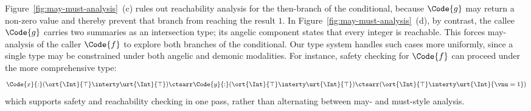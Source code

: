 Figure~\ref{fig:may-must-analysis}~(c) rules out reachability analysis for the then-branch of the conditional, because $\Code{g}$ may return a non-zero value and thereby prevent that branch from reaching the result $1$. In Figure~\ref{fig:may-must-analysis}~(d), by contrast, the callee $\Code{g}$ carries two summaries as an intersection type; its angelic component states that every integer is reachable. This forces may-analysis of the caller $\Code{f}$ to explore both branches of the conditional. Our type system handles such cases more uniformly, since a single type may be constrained under both angelic and demonic modalities. For instance, safety checking for $\Code{f}$ can proceed under the more comprehensive type:
\begin{align*}
    \Code{x}{:}(\ort{\Int}{\top}\interty \urt{\Int}{\top})\ctsarr\Code{y}{:}(\ort{\Int}{\top}\interty \urt{\Int}{\top})\ctsarr(\ort{\Int}{\top}\interty \urt{\Int}{\vnu = 1})
\end{align*}\noindent
which supports safety and reachability checking in one pass, rather than alternating between may- and must-style analysis.

